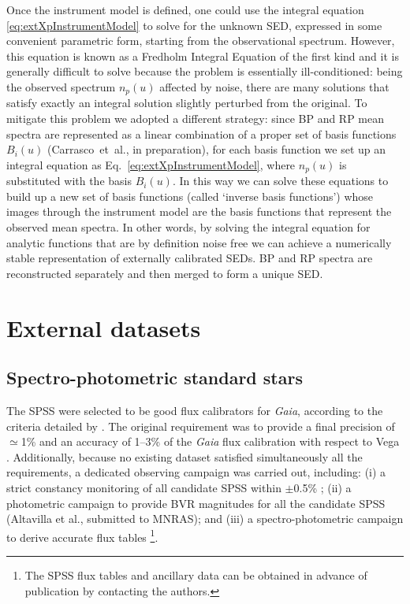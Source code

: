 \documentclass{aa}
\newcommand{\xp}{BP and RP\xspace}
\newcommand{\citeipt}[1]{#1~et~al., in preparation\xspace}
\newcommand{\citeipp}[1]{(\citeipt{#1})\xspace}
\newcommand{\equref}[1]{Eq.~\ref{eq:#1}}
\begin{document}
\begin{appendix}
Once the instrument model is defined, one could use the integral equation \ref{eq:extXpInstrumentModel} to solve for the unknown SED, expressed in some convenient parametric form, starting from the observational spectrum. However, this equation is known as a Fredholm Integral Equation of the first kind and it is generally difficult to solve because the problem is essentially ill-conditioned: being the observed spectrum $n_p(u)$ affected by noise, there are many solutions that satisfy exactly an integral solution slightly perturbed from the original. To mitigate this problem we adopted a different strategy: since \xp mean spectra are represented as a linear combination of a proper set of basis functions $B_i(u)$ \citeipp{Carrasco}, for each basis function we set up an integral equation as \equref{extXpInstrumentModel}, where $n_p(u)$ is substituted with the basis $B_i(u)$. In this way  we can solve these equations to build up a new set of basis functions (called `inverse basis functions') whose images through the instrument model are the basis functions that represent the observed mean spectra. In other words, by solving the integral equation for analytic functions that are by definition noise free  we can achieve a numerically stable representation of externally calibrated SEDs. BP and RP spectra are reconstructed separately and then merged to form a unique SED.

\section{External datasets}\label{sec:extds}

\subsection{Spectro-photometric standard stars}

The SPSS were selected to be good flux calibrators for {\em Gaia}, according to the criteria detailed by \citet{SPSS}. The original requirement was to provide a final precision of $\simeq$1\% and an accuracy of 1--3\% of the {\em Gaia} flux calibration with respect to Vega \citep{bohlin14}. Additionally, because no existing dataset satisfied simultaneously all the requirements, a dedicated observing campaign was carried out, including: (i) a strict constancy monitoring of all candidate SPSS within $\pm$0.5\% \citep{SPSS3}; (ii) a photometric campaign to provide BVR magnitudes for all the candidate SPSS (Altavilla et al., submitted to MNRAS); and (iii) a spectro-photometric campaign to derive accurate flux tables \citep[][Pancino et al., in preparation]{SPSS2}\footnote{The SPSS flux tables and ancillary data can be obtained in advance of publication by contacting the authors.}.


\end{appendix}
\end{document}
